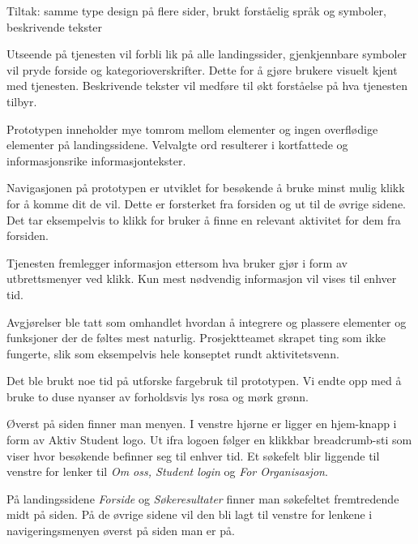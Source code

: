 Tiltak: samme type design på flere sider, brukt forståelig språk og symboler, beskrivende tekster

Utseende på tjenesten vil forbli lik på alle landingssider, gjenkjennbare symboler vil pryde forside og kategorioverskrifter. Dette for å gjøre brukere visuelt kjent med tjenesten. Beskrivende tekster vil medføre til økt forståelse på hva tjenesten tilbyr.

Prototypen inneholder mye tomrom mellom elementer og ingen overflødige elementer på landingssidene. Velvalgte ord resulterer i kortfattede og informasjonsrike informasjontekster.

Navigasjonen på prototypen er utviklet for besøkende å bruke minst mulig klikk for å komme dit de vil. Dette er forsterket fra forsiden og ut til de øvrige sidene. Det tar eksempelvis to klikk for bruker å finne en relevant aktivitet for dem fra forsiden.

Tjenesten fremlegger informasjon ettersom hva bruker gjør i form av utbrettsmenyer ved klikk. Kun mest nødvendig informasjon vil vises til enhver tid.

Avgjørelser ble tatt som omhandlet hvordan å integrere og plassere elementer og funksjoner der de føltes mest naturlig. Prosjektteamet skrapet ting som ikke fungerte, slik som eksempelvis hele konseptet rundt aktivitetsvenn.

Det ble brukt noe tid på utforske fargebruk til prototypen. Vi endte opp med å bruke to duse nyanser av forholdsvis lys rosa og mørk grønn.

Øverst på siden finner man menyen. I venstre hjørne er ligger en hjem-knapp i form av Aktiv Student logo. Ut ifra logoen følger en klikkbar breadcrumb-sti som viser hvor besøkende befinner seg til enhver tid. Et søkefelt blir liggende til venstre for lenker til {\em Om oss, Student login} og {\em For Organisasjon}.

På landingssidene {\em Forside} og {\em Søkeresultater} finner man søkefeltet fremtredende midt på siden. På de øvrige sidene vil den bli lagt til venstre for lenkene i navigeringsmenyen øverst på siden man er på.


